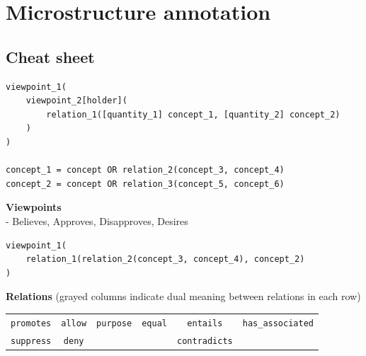 \section{Microstructure annotation}
\label{sec:microstructure_annotation_appendix}


\subsection*{Cheat sheet}

\begin{verbatim}
viewpoint_1(
	viewpoint_2[holder](
		relation_1([quantity_1] concept_1, [quantity_2] concept_2)
	)
)

concept_1 = concept OR relation_2(concept_3, concept_4)
concept_2 = concept OR relation_3(concept_5, concept_6)

\end{verbatim}

\noindent \textbf{Viewpoints} \\
- Believes, Approves, Disapproves, Desires

\begin{verbatim}
viewpoint_1(
	relation_1(relation_2(concept_3, concept_4), concept_2)
)
\end{verbatim}

\noindent \textbf{Relations} (grayed columns indicate dual meaning between relations in each row)

\begin{table}[!htb]
\begin{tabular}{|c c c c c c|}
\hline
\cellcolor{gray!25} \texttt{promotes} & \cellcolor{gray!25}\texttt{allow} & \texttt{purpose} & \texttt{equal} & \cellcolor{gray!25}\texttt{entails}     & \texttt{has\_associated} \\
\cellcolor{gray!25} \texttt{suppress} & \cellcolor{gray!25}\texttt{deny}  &         &       & \cellcolor{gray!25}\texttt{contradicts} &  \\
\hline
\end{tabular}
\end{table}

